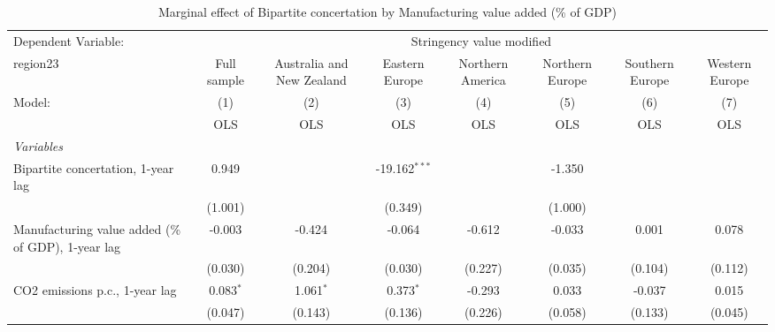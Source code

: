 
\begin{table}[htbp]
   \caption{Marginal effect of Bipartite concertation by Manufacturing value added (\% of GDP)}
   \centering
   \begin{tabular}{lccccccc}
      \toprule
      Dependent Variable: & \multicolumn{7}{c}{Stringency value modified}\\
      region23                                                                                & Full sample   & Australia and New Zealand & Eastern Europe  & Northern America & Northern Europe & Southern Europe & Western Europe \\   
      Model:                                                                                  & (1)           & (2)                       & (3)             & (4)              & (5)             & (6)             & (7)\\  
                                                                                              &  OLS          & OLS                       & OLS             & OLS              & OLS             & OLS             & OLS\\  
      \midrule
      \emph{Variables}\\
      Bipartite concertation, 1-year lag                                                      & 0.949         &                           & -19.162$^{***}$ &                  & -1.350          &                 &   \\   
                                                                                              & (1.001)       &                           & (0.349)         &                  & (1.000)         &                 &   \\   
      Manufacturing value added (\% of GDP), 1-year lag                                       & -0.003        & -0.424                    & -0.064          & -0.612           & -0.033          & 0.001           & 0.078\\   
                                                                                              & (0.030)       & (0.204)                   & (0.030)         & (0.227)          & (0.035)         & (0.104)         & (0.112)\\   
      CO2 emissions p.c., 1-year lag                                                          & 0.083$^{*}$   & 1.061$^{*}$               & 0.373$^{*}$     & -0.293           & 0.033           & -0.037          & 0.015\\   
                                                                                              & (0.047)       & (0.143)                   & (0.136)         & (0.226)          & (0.058)         & (0.133)         & (0.045)\\   

\end{tabular}
\end{table}
